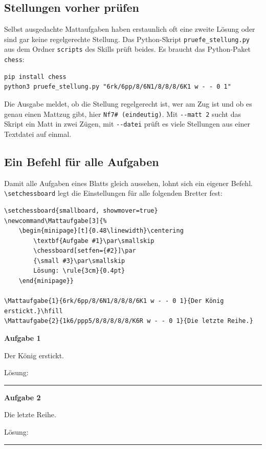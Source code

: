 \subsection{Stellungen vorher prüfen}

Selbst ausgedachte Mattaufgaben haben erstaunlich oft eine zweite Lösung oder sind gar keine regelgerechte Stellung. Das Python-Skript \texttt{pruefe\_stellung.py} aus dem Ordner \texttt{scripts} des Skills prüft beides. Es braucht das Python-Paket \texttt{chess}:

\begin{lstlisting}[style=latex]
pip install chess
python3 pruefe_stellung.py "6rk/6pp/8/6N1/8/8/8/6K1 w - - 0 1"
\end{lstlisting}

Die Ausgabe meldet, ob die Stellung regelgerecht ist, wer am Zug ist und ob es genau einen Mattzug gibt, hier \texttt{Nf7\# (eindeutig)}. Mit \texttt{-{}-matt 2} sucht das Skript ein Matt in zwei Zügen, mit \texttt{-{}-datei} prüft es viele Stellungen aus einer Textdatei auf einmal.


\subsection{Ein Befehl für alle Aufgaben}

Damit alle Aufgaben eines Blatts gleich aussehen, lohnt sich ein eigener Befehl. \texttt{\textbackslash setchessboard} legt die Einstellungen für alle folgenden Bretter fest:

\begin{lstlisting}[style=latex]
\setchessboard{smallboard, showmover=true}
\newcommand\Mattaufgabe[3]{%
	\begin{minipage}[t]{0.48\linewidth}\centering
		\textbf{Aufgabe #1}\par\smallskip
		\chessboard[setfen={#2}]\par
		{\small #3}\par\smallskip
		Lösung: \rule{3cm}{0.4pt}
	\end{minipage}}

\Mattaufgabe{1}{6rk/6pp/8/6N1/8/8/8/6K1 w - - 0 1}{Der König erstickt.}\hfill
\Mattaufgabe{2}{1k6/ppp5/8/8/8/8/8/K6R w - - 0 1}{Die letzte Reihe.}
\end{lstlisting}

\begin{ausgabe}
	\newcommand\Mattaufgabe[3]{%
		\begin{minipage}[t]{0.48\linewidth}\centering
			\textbf{Aufgabe #1}\par\smallskip
			\chessboard[setfen={#2}]\par
			{\small #3}\par\smallskip
			Lösung: \rule{3cm}{0.4pt}
		\end{minipage}}

	\Mattaufgabe{1}{6rk/6pp/8/6N1/8/8/8/6K1 w - - 0 1}{Der König erstickt.}\hfill
	\Mattaufgabe{2}{1k6/ppp5/8/8/8/8/8/K6R w - - 0 1}{Die letzte Reihe.}
\end{ausgabe}

